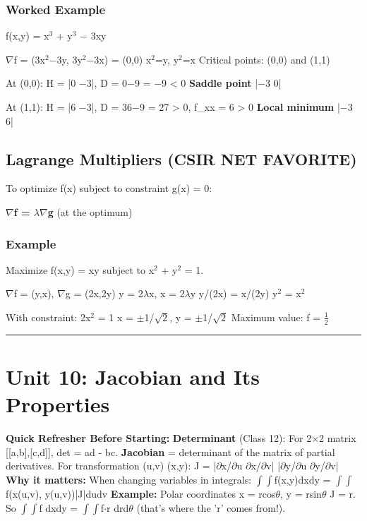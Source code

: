 \documentclass[12pt,a4paper,openany]{book}
\begin{document}
{{\subsubsection{Worked Example}
f(x,y) = x$^3$ + y$^3$ − 3xy

$\nabla$f = (3x$^2$−3y, 3y$^2$−3x) = (0,0)  x$^2$=y, y$^2$=x  Critical points: (0,0) and (1,1)

At (0,0): H = |0  −3|, D = 0−9 = −9 < 0  \textbf{Saddle point}
              |−3  0|

At (1,1): H = |6  −3|, D = 36−9 = 27 > 0, f_xx = 6 > 0  \textbf{Local minimum}
              |−3  6|

\subsection{Lagrange Multipliers  (CSIR NET FAVORITE)}

To optimize f(x) subject to constraint g(x) = 0:

\textbf{$\nabla$f = $\lambda\nabla$g} (at the optimum)

\subsubsection{Example}
Maximize f(x,y) = xy subject to x$^2$ + y$^2$ = 1.

$\nabla$f = (y,x), $\nabla$g = (2x,2y)
y = 2$\lambda$x, x = 2$\lambda$y  y/(2x) = x/(2y)  y$^2$ = x$^2$

With constraint: 2x$^2$ = 1  x = $\pm$1/$\sqrt{2}$, y = $\pm$1/$\sqrt{2}$
Maximum value: f = $\frac{1}{2}$

\bigskip\noindent\rule{\textwidth}{0.4pt}\bigskip

\section{Unit 10: Jacobian and Its Properties }

\begin{prereqbox}
 \textbf{Quick Refresher Before Starting:}
\textbf{Determinant} (Class 12): For 2$\times$2 matrix [[a,b],[c,d]], det = ad - bc.
\textbf{Jacobian} = determinant of the matrix of partial derivatives.
For transformation (u,v)  (x,y): J = |$\partial$x/$\partial$u  $\partial$x/$\partial$v|
|$\partial$y/$\partial$u  $\partial$y/$\partial$v|
\textbf{Why it matters:} When changing variables in integrals:
$\int\int$f(x,y)dxdy = $\int\int$f(x(u,v), y(u,v))|J|dudv
\textbf{Example:} Polar coordinates x = rcos$\theta$, y = rsin$\theta$  J = r.
So $\int\int$f dxdy = $\int\int$f$\cdot$r drd$\theta$ (that's where the 'r' comes from!).
\end{prereqbox}


}}
\end{document}
